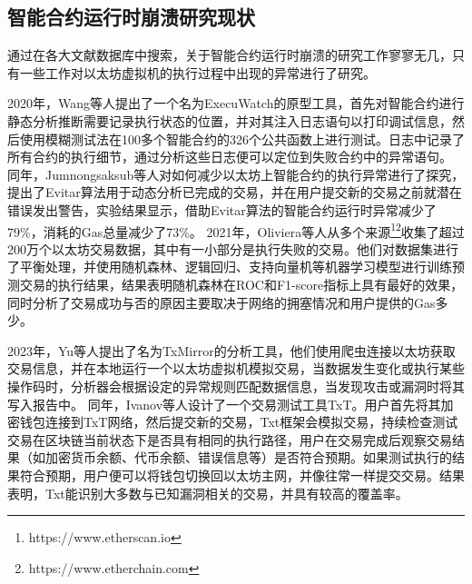 \subsection{智能合约运行时崩溃研究现状}
\label{sec:智能合约运行时崩溃研究现状}
通过在各大文献数据库中搜索，关于智能合约运行时崩溃的研究工作寥寥无几，只有一些工作对以太坊虚拟机的执行过程中出现的异常进行了研究。


2020年，Wang等人提出了一个名为ExecuWatch\cite{wang2020onthe}的原型工具，首先对智能合约进行静态分析推断需要记录执行状态的位置，并对其注入日志语句以打印调试信息，然后使用模糊测试法在100多个智能合约的326个公共函数上进行测试。日志中记录了所有合约的执行细节，通过分析这些日志便可以定位到失败合约中的异常语句。
同年，Jumnongsaksub等人\cite{reducing2020}对如何减少以太坊上智能合约的执行异常进行了探究，提出了Evitar算法用于动态分析已完成的交易，并在用户提交新的交易之前就潜在错误发出警告，实验结果显示，借助Evitar算法的智能合约运行时异常减少了79\%，消耗的Gas总量减少了73\%。
2021年，Oliviera等人\cite{oliveira_analyzing_2021}从多个来源\footnote{https://www.etherscan.io}\footnote{https://www.etherchain.com}收集了超过200万个以太坊交易数据，其中有一小部分是执行失败的交易。他们对数据集进行了平衡处理，并使用随机森林、逻辑回归、支持向量机等机器学习模型进行训练预测交易的执行结果，结果表明随机森林在ROC和F1-score指标上具有最好的效果，同时分析了交易成功与否的原因主要取决于网络的拥塞情况和用户提供的Gas多少。

2023年，Yu等人提出了名为TxMirror的分析工具\cite{Yu_2023}，他们使用爬虫连接以太坊获取交易信息，并在本地运行一个以太坊虚拟机模拟交易，当数据发生变化或执行某些操作码时，分析器会根据设定的异常规则匹配数据信息，当发现攻击或漏洞时将其写入报告中。
同年，Ivanov等人设计了一个交易测试工具TxT\cite{IvanovTxT}。用户首先将其加密钱包连接到TxT网络，然后提交新的交易，Txt框架会模拟交易，持续检查测试交易在区块链当前状态下是否具有相同的执行路径，用户在交易完成后观察交易结果（如加密货币余额、代币余额、错误信息等）是否符合预期。如果测试执行的结果符合预期，用户便可以将钱包切换回以太坊主网，并像往常一样提交交易。结果表明，Txt能识别大多数与已知漏洞相关的交易，并具有较高的覆盖率。


